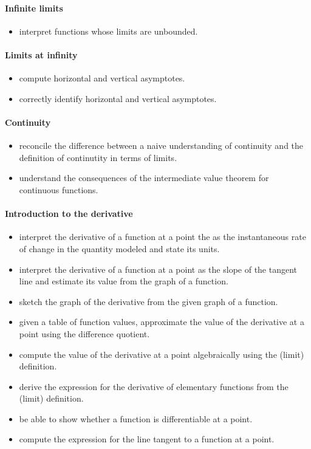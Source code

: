 \documentclass{amsart}
\begin{document}
\paragraph*{Infinite limits}
\begin{itemize}
\item interpret functions whose limits are unbounded.
\end{itemize}

\paragraph*{Limits at infinity}
\begin{itemize}
\item compute horizontal and vertical asymptotes. 
\item correctly identify horizontal and vertical asymptotes. 
\end{itemize}


\paragraph*{Continuity}
\begin{itemize}
\item reconcile the difference between a naive understanding of
  continuity and the definition of continutity in terms of limits.
\item understand the consequences of the intermediate value theorem
  for continuous functions.
\end{itemize}

\paragraph*{Introduction to the derivative}
\begin{itemize}
\item interpret the derivative of a function at a point the as the
  instantaneous rate of change in the quantity modeled and state its
  units.
\item interpret the derivative of a function at a point as the slope
  of the tangent line and estimate its value from the graph of a
  function.
\item sketch the graph of the derivative from the given graph of a function.
\item given a table of function values, approximate the value of the
  derivative at a point using the difference quotient.
\item compute the value of the derivative at a point algebraically
  using the (limit) definition.
\item derive the expression for the derivative of elementary functions
  from the (limit) definition.
\item be able to show whether a function is differentiable at a point.
\item compute the expression for the line tangent to a function at a point.
\end{itemize}
\end{document}
